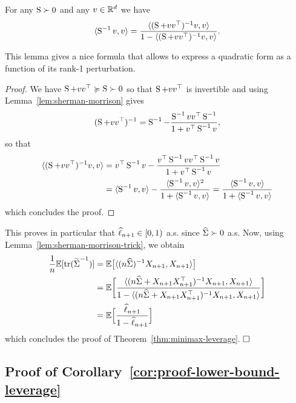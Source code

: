 \begin{lemma}
	\label{lem:sherman-morrison-trick}
 	For any $\bS \succ 0$ and any $v \in \R^d$ we have
	 \begin{equation*}
	 	\inr{\bS^{-1} v, v} = \frac{\inr{(\bS + v v^\top)^{-1} v, v}}{1 - \inr{(\bS + v v^\top)^{-1} v, v}}.
	 \end{equation*}
\end{lemma}
This lemma gives a nice formula that allows to express a quadratic form as a function of its rank-1 perturbation.
\begin{proof}
	We have $\bS + v v^\top \mgeq \bS \succ 0$ so that $\bS + v v^\top$ is invertible and using Lemma~\ref{lem:sherman-morrison} gives
	\begin{equation*}
		(\bS + v v^\top)^{-1} = \bS^{-1} - \frac{\bS^{-1} v v^\top \bS^{-1}}{1 + v^\top \bS^{-1} v},
	\end{equation*}
	so that 
	\begin{align*}
		\inr{(\bS + v v^\top)^{-1} v, v} &= v^\top \bS^{-1} v - \frac{v^\top \bS^{-1} v v^\top \bS^{-1} v}{1 + v^\top \bS^{-1} v} \\
		&= \inr{\bS^{-1} v, v} - \frac{\inr{\bS^{-1} v, v}^2}{1 + \inr{\bS^{-1} v, v}} = \frac{\inr{\bS^{-1} v, v}}{1 + \inr{\bS^{-1} v, v}}
	\end{align*}
	which concludes the proof.
\end{proof}
This proves in particular that $\wh \ell_{n+1} \in [0, 1)$ a.s. since $\wh \bSigma \succ 0$ a.s.
Now, using Lemma~\ref{lem:sherman-morrison-trick}, we obtain
\begin{align*}
	\frac 1n \E [\tr( \wt \bSigma^{-1}) ] &= \E \big[ \inr{(n \wh \bSigma)^{-1} X_{n+1}, X_{n+1}} \big] \\
	&= \E \bigg[ \frac{ \inr{(n \wh \bSigma + X_{n+1} X_{n+1}^\top)^{-1} X_{n+1}, X_{n+1} }}{1 - \inr{(n \wh \bSigma + X_{n+1} X_{n+1}^\top)^{-1} X_{n+1}, X_{n+1} } } \bigg] \\
	&= \E \Big[ \frac{\wh \ell_{n+1}}{1 - \wh \ell_{n+1}} \Big]
\end{align*}
which concludes the proof of Theorem~\ref{thm:minimax-leverage}. $\hfill \square$

\subsection{Proof of Corollary~\ref{cor:proof-lower-bound-leverage}} %

